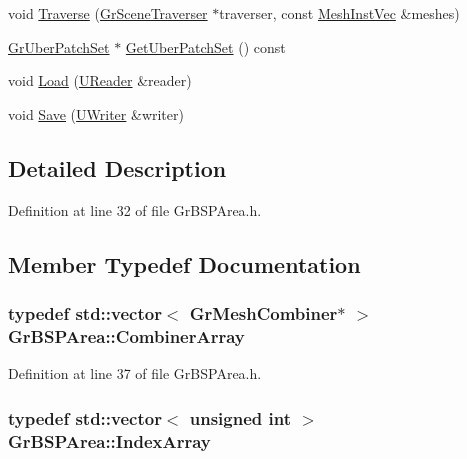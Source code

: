 \begin{CompactItemize}
\item 
void \hyperlink{class_gr_b_s_p_area_80374c27c8e8b56812437625236d5f9b}{Traverse} (\hyperlink{class_gr_scene_traverser}{GrSceneTraverser} $\ast$traverser, const \hyperlink{class_gr_b_s_p_area_ca3e4c6211c02064ec2d70b4f61738a8}{MeshInstVec} \&meshes)
\item 
\hyperlink{class_gr_uber_patch_set}{GrUberPatchSet} $\ast$ \hyperlink{class_gr_b_s_p_area_248885c47602b8b30198e011d05a9b1b}{GetUberPatchSet} () const 
\item 
void \hyperlink{class_gr_b_s_p_area_e0b79578e1c1ffc335e6f37d7daf6349}{Load} (\hyperlink{class_u_reader}{UReader} \&reader)
\item 
void \hyperlink{class_gr_b_s_p_area_5d647ed462a407fc32cf9101515e9c40}{Save} (\hyperlink{class_u_writer}{UWriter} \&writer)
\end{CompactItemize}


\subsection{Detailed Description}


Definition at line 32 of file GrBSPArea.h.

\subsection{Member Typedef Documentation}
\hypertarget{class_gr_b_s_p_area_31bece0da485709ff48572c457c2a3f4}{
\subsubsection[{CombinerArray}]{\setlength{\rightskip}{0pt plus 5cm}typedef std::vector$<$ {\bf GrMeshCombiner}$\ast$ $>$ {\bf GrBSPArea::CombinerArray}}}
\label{class_gr_b_s_p_area_31bece0da485709ff48572c457c2a3f4}




Definition at line 37 of file GrBSPArea.h.\hypertarget{class_gr_b_s_p_area_71a5e7cae58da5ccbce3662b378784ec}{
\subsubsection[{IndexArray}]{\setlength{\rightskip}{0pt plus 5cm}typedef std::vector$<$ unsigned int $>$ {\bf GrBSPArea::IndexArray}}}
\label{class_gr_b_s_p_area_71a5e7cae58da5ccbce3662b378784ec}




